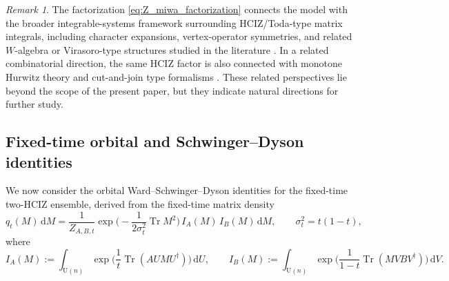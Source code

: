 \documentclass[11pt,a4paper]{article}
\theoremstyle{definition}\newtheorem{definition}[theorem]{Definition}
\theoremstyle{remark}\newtheorem{remark}[theorem]{Remark}
\numberwithin{equation}{section}
\DeclareMathOperator{\Tr}{Tr}
\newcommand{\dd}{\mathrm{d}}
\newcommand{\UU}{\mathrm{U}(n)}
\begin{document}
\begin{remark}
The factorization \eqref{eq:Z_miwa_factorization} connects the model with the broader integrable-systems framework surrounding HCIZ/Toda-type matrix integrals, including character expansions, vertex-operator symmetries, and related $W$-algebra or Virasoro-type structures studied in the literature
\cite{Carrell2015,ZinnJustin2002,AdlerShiotaVanMoerbeke1998,AdlerShiotaVanMoerbeke1994,AdlerShiotaVanMoerbeke1995,AdlerVanMoerbeke1995}. In a related combinatorial direction, the same HCIZ factor is also connected with monotone Hurwitz theory and cut-and-join type formalisms
\cite{GouldenGuayPaquetNovak2014}. These related perspectives lie beyond the scope of the present paper, but they indicate natural directions for further study.
\end{remark}
 

 \subsection{Fixed-time orbital and Schwinger--Dyson identities}
 

We now consider the orbital Ward--Schwinger--Dyson identities for the fixed-time two-HCIZ ensemble, derived from the fixed-time matrix density
\begin{equation} 
q_t(M)\,\dd M
=
\frac{1}{Z_{A,B,t}}
\exp\!\Big(-\frac{1}{2\sigma_t^2}\Tr M^2\Big)\,
I_A(M)\,I_B(M)\,\dd M,
\qquad
\sigma_t^2=t(1-t),
\end{equation}
where  
\begin{equation} 
I_A(M):=\int_{\UU}\exp\!\Big(\frac1t\Tr(AUMU^\dagger)\Big)\,\dd U,
\qquad
I_B(M):=\int_{\UU}\exp\!\Big(\frac1{1-t}\Tr(MVBV^\dagger)\Big)\,\dd V.
\end{equation}
\end{document}
